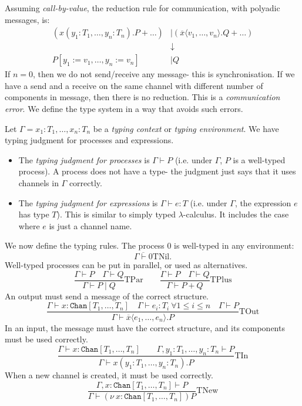 \documentclass[a4paper, openany]{memoir}
\theoremstyle{definition}
\begin{document}
    Assuming \emph{call-by-value}, the reduction rule for communication, with polyadic messages, is:
    \begin{align*}
        (x(y_1 \colon T_1, \dots, y_n \colon T_n).P + \dots) &\mid 
        (\overline{x}\langle v_1, \dots, v_n \rangle.Q + \dots) \\
        &\downarrow \\
        P[y_1 := v_1, \dots, y_n := v_n] &\mid Q
    \end{align*}
    If $n = 0$, then we do not send/receive any message- this is synchronisation. If we have a send and a receive on the same channel with different number of components in message, then there is no reduction. This is a \emph{communication error}. We define the type system in a way that avoids such errors.

    Let $\Gamma = x_1 \colon T_1, \dots, x_n \colon T_n$ be a \emph{typing context} or \emph{typing environment}. We have typing judgment for processes and expressions.
    \begin{itemize}
        \item The \emph{typing judgment for processes} is $\Gamma \vdash P$ (i.e. under $\Gamma$, $P$ is a well-typed process). A process does not have a type- the judgment just says that it uses channels in $\Gamma$ correctly. 
        \item The \emph{typing judgment for expressions} is $\Gamma \vdash e \colon T$ (i.e. under $\Gamma$, the expression $e$ has type $T$). This is similar to simply typed $\lambda$-calculus. It includes the case where $e$ is just a channel name.
    \end{itemize}
    
    We now define the typing rules. The process $0$ is well-typed in any environment:
    \[\overline{\Gamma \vdash 0} \textrm{TNil}.\]
    Well-typed processes can be put in parallel, or used as alternatives.
    \[\frac{\Gamma \vdash P \quad \Gamma \vdash Q}{\Gamma \vdash P \mid Q} \textrm{TPar} \qquad \frac{\Gamma \vdash P \quad \Gamma \vdash Q}{\Gamma \vdash P + Q} \textrm{TPlus}\]
    An output must send a message of the correct structure.
    \[\frac{\Gamma \vdash x \colon \texttt{Chan}[T_1, \dots, T_n] \quad \Gamma \vdash e_i \colon T_i \ \forall 1 \leq i \leq n \quad \Gamma \vdash P}{\Gamma \vdash \overline{x} \langle e_1, \dots, e_n\rangle.P} \textrm{TOut}\]
    In an input, the message must have the correct structure, and its components must be used correctly.
    \[\frac{\Gamma \vdash x \colon \texttt{Chan}[T_1, \dots, T_n] \qquad \Gamma, y_1 \colon T_1, \dots, y_n \colon T_n \vdash P}{\Gamma \vdash x(y_1 \colon T_1, \dots, y_n \colon T_n).P} \textrm{TIn}\]
    When a new channel is created, it must be used correctly.
    \[\frac{\Gamma, x \colon \texttt{Chan}[T_1, \dots, T_n] \vdash P}{\Gamma \vdash (\nu \ x \colon \texttt{Chan}[T_1, \dots, T_n]) P} \textrm{TNew}\]
\end{document}
